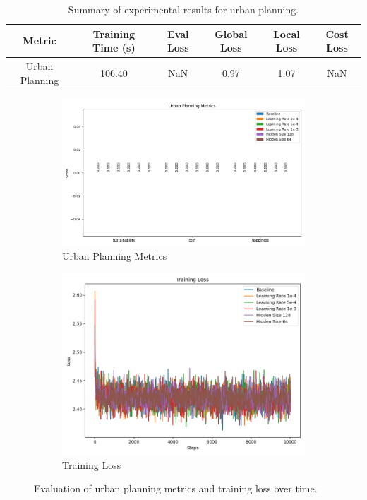 \documentclass{article} %
\begin{document}
\begin{table}[h]
    \centering
    \begin{tabular}{cccccc}
        \toprule
        Metric & Training Time (s) & Eval Loss & Global Loss & Local Loss & Cost Loss \\
        \midrule
        Urban Planning & 106.40 & NaN & 0.97 & 1.07 & NaN \\
        \bottomrule
    \end{tabular}
    \caption{Summary of experimental results for urban planning.}
    \label{tab:results}
\end{table}

\begin{figure}[h]
    \centering
    \begin{subfigure}{0.49\textwidth}
        \includegraphics[width=\textwidth]{urban_metrics.png}
        \caption{Urban Planning Metrics}
        \label{fig:urban_metrics}
    \end{subfigure}
    \hfill
    \begin{subfigure}{0.49\textwidth}
        \includegraphics[width=\textwidth]{training_loss.png}
        \caption{Training Loss}
        \label{fig:training_loss}
    \end{subfigure}
    \caption{Evaluation of urban planning metrics and training loss over time.}
    \label{fig:evaluation}
\end{figure}
\end{document}
